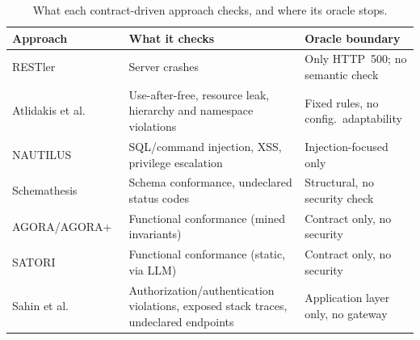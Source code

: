 \documentclass[
]{ceurart}
\begin{document}
\begin{table}
  \small
  \caption{What each contract-driven approach checks, and where its oracle stops.}
  \label{tab:related}
  \begin{tabular}{l p{} p{}}
    \toprule
    \textbf{Approach}                                                                           & \textbf{What it checks}                                                             & \textbf{Oracle boundary}              \\
    \midrule
    RESTler~\cite{atlidakisRESTlerStatefulREST2019a}                                            & Server crashes                                                                      & Only HTTP~500; no semantic check      \\
    Atlidakis et al.~\cite{atlidakisCheckingSecurityProperties2020}                             & Use-after-free, resource leak, hierarchy and namespace violations                   & Fixed rules, no config.\ adaptability \\
    NAUTILUS~\cite{dengNAUTILUSAutomatedRESTful2023}                                            & SQL/command injection, XSS, privilege escalation                                    & Injection-focused only                \\
    Schemathesis~\cite{schemathesisDerivingSemanticsawareFuzzers2022}                           & Schema conformance, undeclared status codes                                         & Structural, no security check         \\
    AGORA/AGORA+~\cite{alonsoAGORAAutomatedGeneration2023,alonsoAgora+TestOracleGeneration2025} & Functional conformance (mined invariants)                                           & Contract only, no security            \\
    SATORI~\cite{alonsoSATORIStaticTest2025}                                                    & Functional conformance (static, via LLM)                                            & Contract only, no security            \\
    Sahin et al.~\cite{sahinEnhancingRESTAPI2026}                                               & Authorization/authentication violations, exposed stack traces, undeclared endpoints & Application layer only, no gateway    \\
    \bottomrule
  \end{tabular}
\end{table}
\end{document}
